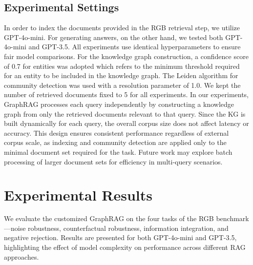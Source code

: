 \documentclass[letterpaper, 10 pt, conference]{ieeeconf}  %
\begin{document}



\subsection{Experimental Settings}


In order to index the documents provided in the RGB retrieval step, we utilize GPT-4o-mini. For generating answers, on the other hand, we tested both GPT-4o-mini and GPT-3.5. All experiments use identical hyperparameters to ensure fair model comparisons. For the knowledge graph construction, a confidence score of 0.7 for entities was adopted which refers to the minimum threshold required for an entity to be included in the knowledge graph. The Leiden algorithm for community detection was used with a resolution parameter of 1.0. We kept the number of retrieved documents fixed to 5 for all experiments. In our experiments, GraphRAG processes each query independently by constructing a knowledge graph from only the retrieved documents relevant to that query. Since the KG is built dynamically for each query, the overall corpus size does not affect latency or accuracy. This design ensures consistent performance regardless of external corpus scale, as indexing and community detection are applied only to the minimal document set required for the task. Future work may explore batch processing of larger document sets for efficiency in multi-query scenarios.



\section{Experimental Results}
\label{sec:results}
We evaluate the customized GraphRAG on the four tasks of the RGB benchmark—noise robustness, counterfactual robustness, information integration, and negative rejection. Results are presented for both GPT-4o-mini and GPT-3.5, highlighting the effect of model complexity on performance across different RAG approaches.
\end{document}
